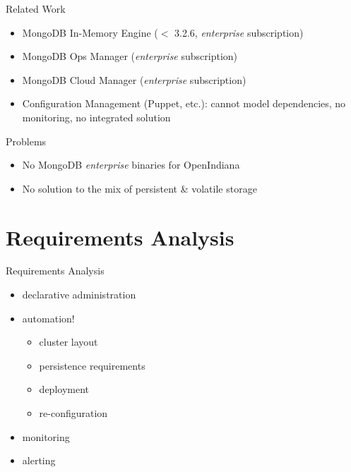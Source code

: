 \documentclass[11pt,aspectratio=169]{beamer}
\begin{document}
    \begin{frame}{Related Work}
        
        \begin{itemize}
            \item MongoDB In-Memory Engine ($<$ 3.2.6, \textit{enterprise} subscription)
            \item MongoDB Ops Manager (\textit{enterprise} subscription)
            \item MongoDB Cloud Manager (\textit{enterprise} subscription)
            \item Configuration Management (Puppet, etc.): cannot model dependencies, no monitoring, no integrated solution
        \end{itemize}
        
        Problems
        
        \begin{itemize}
            \item No MongoDB \textit{enterprise} binaries for OpenIndiana
            \item No solution to the mix of persistent \& volatile storage 
        \end{itemize}
        
    \end{frame}
    
    
    \section{Requirements Analysis}
   
   \begin{frame}{Requirements Analysis}
       \begin{itemize}
           \item declarative administration
           \item automation!
           \begin{itemize}
               \item cluster layout
               \item persistence requirements
               \item deployment
               \item re-configuration
            \end{itemize}
            \item monitoring
            \item alerting
        \end{itemize}
    \end{frame}
    
\end{document}
